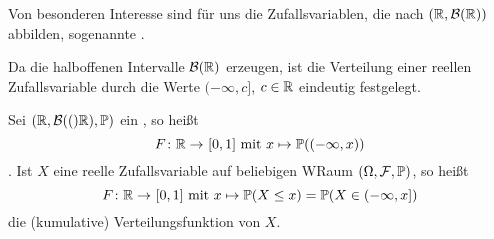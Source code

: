 Von besonderen Interesse sind für uns die Zufallsvariablen, die nach $(\mathbb{R}, \mathcal{B}(\mathbb{R}))$ abbilden, sogenannte .

Da die halboffenen Intervalle $\mathcal{B}(\mathbb{R})$ erzeugen, ist die Verteilung einer reellen Zufallsvariable durch die Werte $(-\infty, c]$, $c \in \mathbb{R}$ eindeutig festgelegt.

\begin{definition}[Verteilungsfunktion]
    Sei $(\mathbb{R}, \mathcal{B}(()\mathbb{R}), \mathbb{P})$ ein \WRaum, so heißt
    \begin{equation*}
        \abb{F}{\R}{[0,1]} \text{ mit } x \mapsto \P((-\infty, x))
    \end{equation*}
    .    
    Ist $X$ eine reelle Zufallsvariable auf beliebigen WRaum $(\Omega, \mathcal{F}, \mathbb{P})$, so heißt
    \begin{equation*}
        \abb{F}{\R}{[0,1]} \text{ mit } x \mapsto \P(X \leq x) = \P(X \in (-\infty, x])
    \end{equation*} %
    die (kumulative) Verteilungsfunktion von $X$.
\end{definition}